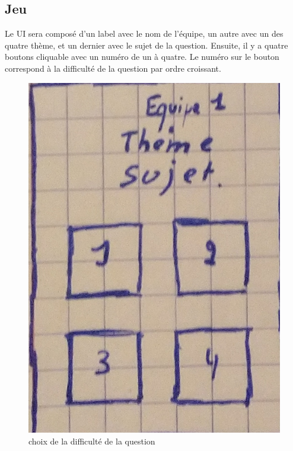 \newpage
\subsection{Jeu}
Le UI sera composé d'un label avec le nom de l'équipe, un autre avec un des quatre thème, et un dernier avec le sujet de la question. Ensuite, il y a quatre boutons cliquable avec un numéro de un à quatre. Le numéro sur le bouton correspond 
à la difficulté de la question par ordre croissant.
\begin{figure}[ht]
	\centering
	\includegraphics[scale=0.5]{jeux.png}
	\caption{choix de la difficulté de la question}
	\label{interface jeu}
\end{figure}

\newpage
